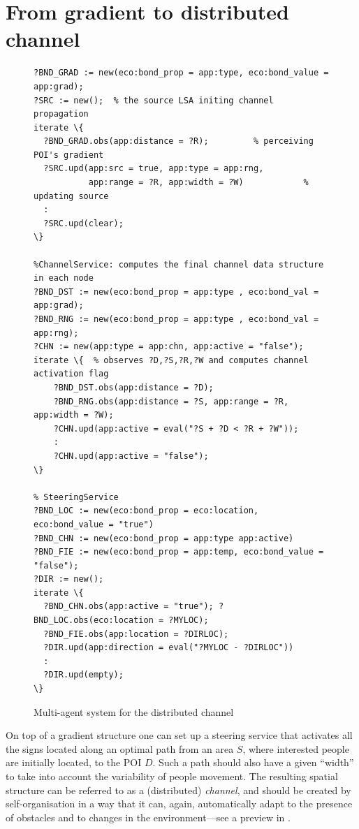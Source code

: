 \documentclass[12pt,a4paper,twoside,openright]{book}
\begin{document}
\section{From gradient to distributed channel}
\begin{figure}
{\footnotesize \begin{Verbatim}[samepage=true, frame=single, commandchars=\\\{\}]
% ChannelSource: initiates the channel propagation
?BND_GRAD := new(eco:bond_prop = app:type, eco:bond_value = app:grad);
?SRC := new();  % the source LSA initing channel propagation
iterate \{   
  ?BND_GRAD.obs(app:distance = ?R);         % perceiving POI's gradient
  ?SRC.upd(app:src = true, app:type = app:rng, 
           app:range = ?R, app:width = ?W)            % updating source
  :
  ?SRC.upd(clear);
\}

%ChannelService: computes the final channel data structure in each node 
?BND_DST := new(eco:bond_prop = app:type , eco:bond_val = app:grad);
?BND_RNG := new(eco:bond_prop = app:type , eco:bond_val = app:rng);
?CHN := new(app:type = app:chn, app:active = "false");
iterate \{  % observes ?D,?S,?R,?W and computes channel activation flag
    ?BND_DST.obs(app:distance = ?D);
    ?BND_RNG.obs(app:distance = ?S, app:range = ?R, app:width = ?W);
    ?CHN.upd(app:active = eval("?S + ?D < ?R + ?W"));
    :
    ?CHN.upd(app:active = "false");
\}

% SteeringService
?BND_LOC := new(eco:bond_prop = eco:location, eco:bond_value = "true")
?BND_CHN := new(eco:bond_prop = app:type app:active)
?BND_FIE := new(eco:bond_prop = app:temp, eco:bond_value = "false");
?DIR := new();
iterate \{
  ?BND_CHN.obs(app:active = "true"); ?BND_LOC.obs(eco:location = ?MYLOC); 
  ?BND_FIE.obs(app:location = ?DIRLOC); 
  ?DIR.upd(app:direction = eval("?MYLOC - ?DIRLOC"))
  :
  ?DIR.upd(empty); 
\}

\end{Verbatim}
}
\caption{Multi-agent system for the distributed channel}
\label{f:mas}
\end{figure}
%
On top of a gradient structure one can set up a steering service that activates all the signs located along an optimal path from an area $S$, where interested people are initially located, to the POI $D$. 
%
Such a path should also have a given ``width'' to take into account the variability of people movement.
%
The resulting spatial structure can be referred to as a (distributed) \emph{channel}, and should be created by self-organisation in a way that it can, again, automatically adapt to the presence of obstacles and to changes in the environment---see a preview in .
\end{document}
